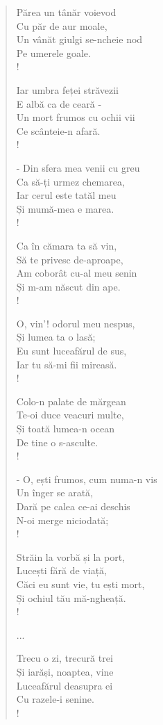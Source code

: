 \documentclass{article}
\begin{document}
\begin{small}
\begin{multicols}{3}
\begin{verse}
Părea un tânăr voievod \\
Cu păr de aur moale, \\
Un vânăt giulgi se-ncheie nod \\
Pe umerele goale. \\!

Iar umbra feței străvezii \\
E albă ca de ceară - \\
Un mort frumos cu ochii vii \\
Ce scânteie-n afară. \\!

- Din sfera mea venii cu greu \\
Ca să-ți urmez chemarea, \\
Iar cerul este tatăl meu \\
Și mumă-mea e marea. \\!

Ca în cămara ta să vin, \\
Să te privesc de-aproape, \\
Am coborât cu-al meu senin \\
Și m-am născut din ape. \\!

O, vin'! odorul meu nespus, \\
Și lumea ta o lasă; \\
Eu sunt luceafărul de sus, \\
Iar tu să-mi fii mireasă. \\!

Colo-n palate de mărgean \\
Te-oi duce veacuri multe, \\
Și toată lumea-n ocean \\
De tine o s-asculte. \\!

- O, ești frumos, cum numa-n vis \\
Un înger se arată, \\
Dară pe calea ce-ai deschis \\
N-oi merge niciodată; \\!

Străin la vorbă și la port, \\
Lucești fără de viață, \\
Căci eu sunt vie, tu ești mort, \\
Și ochiul tău mă-ngheață. \\!

...

Trecu o zi, trecură trei \\
Și iarăși, noaptea, vine \\
Luceafărul deasupra ei \\
Cu razele-i senine. \\!


\end{verse}
\end{multicols}
\end{small}
\end{document}

